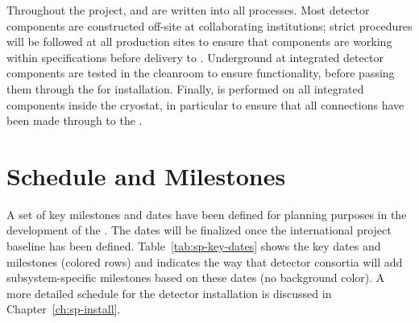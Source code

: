 Throughout the project,  and  are written into all processes. Most detector components are constructed off-site at collaborating institutions; strict  procedures will be followed at all production sites to ensure that components are working within specifications before delivery to . Underground at  integrated detector components are tested in the cleanroom to ensure functionality, before passing them through the  for installation. Finally,  is performed on all integrated components inside the cryostat, in particular to ensure that all connections have been made through to the .

\section{Schedule and Milestones}
\label{sec:fdsp-exec-sched}


A set of key milestones and dates  have been defined for planning purposes in the development of the .  The dates will be finalized once the international project baseline has been defined.  Table~\ref{tab:sp-key-dates} shows the key dates and milestones (colored rows) and indicates the way that detector consortia will add subsystem-specific milestones based on these dates (no background color). A more detailed schedule for the detector installation is discussed in Chapter~\ref{ch:sp-install}.
 
